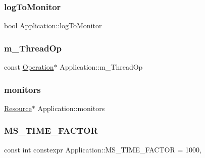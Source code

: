 \subsubsection{\texorpdfstring{log\+To\+Monitor}{logToMonitor}}
{\footnotesize\ttfamily bool Application\+::log\+To\+Monitor\hspace{0.3cm}{\ttfamily [private]}}

\hypertarget{class_application_adedd5777c96839e4238b9956855f3965}{}\label{class_application_adedd5777c96839e4238b9956855f3965} 
\subsubsection{\texorpdfstring{m\+\_\+\+Thread\+Op}{m\_ThreadOp}}
{\footnotesize\ttfamily const \hyperlink{struct_operation}{Operation}$\ast$ Application\+::m\+\_\+\+Thread\+Op\hspace{0.3cm}{\ttfamily [private]}}

\hypertarget{class_application_a77952fc678e1a136dba5835a19db9bd9}{}\label{class_application_a77952fc678e1a136dba5835a19db9bd9} 
\subsubsection{\texorpdfstring{monitors}{monitors}}
{\footnotesize\ttfamily \hyperlink{class_resource}{Resource}$\ast$ Application\+::monitors\hspace{0.3cm}{\ttfamily [private]}}

\hypertarget{class_application_a9caeb1eb00810fa4750e8f5f4d0ad1a5}{}\label{class_application_a9caeb1eb00810fa4750e8f5f4d0ad1a5} 
\subsubsection{\texorpdfstring{M\+S\+\_\+\+T\+I\+M\+E\+\_\+\+F\+A\+C\+T\+OR}{MS\_TIME\_FACTOR}}
{\footnotesize\ttfamily const int constexpr Application\+::\+M\+S\+\_\+\+T\+I\+M\+E\+\_\+\+F\+A\+C\+T\+OR = 1000\hspace{0.3cm}{\ttfamily [static]}, {\ttfamily [private]}}

